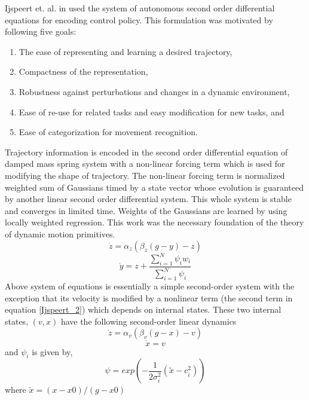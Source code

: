 Ijspeert et. al. in \cite{ijspeert2002movement} used the system of autonomous second order differential equations for encoding control policy. This formulation was motivated by following five goals:
\begin{enumerate}
	\item The ease of representing and learning a desired trajectory, 
	\item Compactness of the representation, 
	\item Robustness against perturbations and changes in a dynamic environment, 
	\item Ease of re-use for related tasks and easy modification for new tasks, and 
	\item Ease of categorization for movement recognition.
\end{enumerate}
Trajectory information is encoded in the second order differential equation of damped mass spring system with a non-linear forcing term which is used for modifying the shape of trajectory. The non-linear forcing term is normalized weighted sum of Gaussians timed by a state vector whose evolution is guaranteed by another linear second order differential system. This whole system is stable and converges in limited time. Weights of the Gaussians are learned by using locally weighted regression. This work was the necessary foundation of the theory of dynamic motion primitives. 
\begin{equation} \label{Ijspeert_1}
	\dot{z} = \alpha_{z}(\beta_{z}(g - y) - z)
\end{equation}
\begin{equation} \label{Ijspeert_2}
	\dot{y} = z + \frac{\sum_{i=1}^{N}\psi_{i}w_{i}}{\sum_{i=1}^{N}\psi_{i}}
\end{equation}
Above system of equations is essentially a simple second-order system with the exception that its velocity is modified by a nonlinear term (the second term in equation \ref{Ijspeert_2}) which depends on internal states. These two internal states, $(v,x)$ have the following second-order linear dynamics
\begin{equation}
\dot{z} = \alpha_{v}(\beta_{v}(g - x) - v)
\end{equation}
\begin{equation}
\dot{x} = v
\end{equation}
and $\psi_{i}$ is given by,
\begin{equation}
\psi = exp(-\frac{1}{2\sigma_{i}^{2}}(\tilde{x} - c_{i}^{2}))
\end{equation}
where $\tilde{x} = (x - x0)/(g - x0)$


